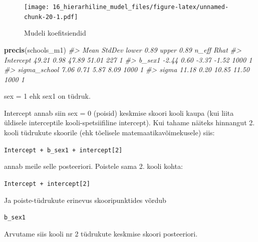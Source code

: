 \documentclass[]{book}
\newenvironment{Shaded}{\begin{snugshade}}{\end{snugshade}}
\newcommand{\KeywordTok}[1]{\textcolor[rgb]{0.13,0.29,0.53}{\textbf{#1}}}
\newcommand{\DataTypeTok}[1]{\textcolor[rgb]{0.13,0.29,0.53}{#1}}
\newcommand{\StringTok}[1]{\textcolor[rgb]{0.31,0.60,0.02}{#1}}
\newcommand{\CommentTok}[1]{\textcolor[rgb]{0.56,0.35,0.01}{\textit{#1}}}
\newcommand{\OperatorTok}[1]{\textcolor[rgb]{0.81,0.36,0.00}{\textbf{#1}}}
\newcommand{\NormalTok}[1]{#1}
\begin{document}
\begin{figure}
\centering
\texttt{[image: 16\_hierarhiline\_mudel\_files/figure-latex/unnamed-chunk-20-1.pdf]}
\caption{\label{fig:unnamed-chunk-20}Mudeli koefitsiendid}
\end{figure}

\begin{Shaded}
\begin{Highlighting}[]
\KeywordTok{precis}\NormalTok{(schools_m1)}
\CommentTok{#>               Mean StdDev lower 0.89 upper 0.89 n_eff Rhat}
\CommentTok{#> Intercept    49.21   0.98      47.89      51.01   227    1}
\CommentTok{#> b_sex1       -2.44   0.60      -3.37      -1.52  1000    1}
\CommentTok{#> sigma_school  7.06   0.71       5.87       8.09  1000    1}
\CommentTok{#> sigma        11.18   0.20      10.85      11.50  1000    1}
\end{Highlighting}
\end{Shaded}

sex = 1 ehk sex1 on tüdruk.

Intercept annab siin sex = 0 (poisid) keskmise skoori kooli kaupa (kui
liita üldisele interceptile kooli-spetsiifiline intercept). Kui tahame
näiteks hinnangut 2. kooli tüdrukute skoorile (ehk tõelisele
matemaatikavõimekusele) siis:

\texttt{Intercept\ +\ b\_sex1\ +\ intercept{[}2{]}}

annab meile selle posteeriori. Poistele sama 2. kooli kohta:

\texttt{Intercept\ +\ intercept{[}2{]}}

Ja poiste-tüdrukute erinevus skooripunktides võrdub

\texttt{b\_sex1}

Arvutame siis kooli nr 2 tüdrukute keskmise skoori posteeriori.

\begin{Shaded}
\end{Shaded}
\end{document}
